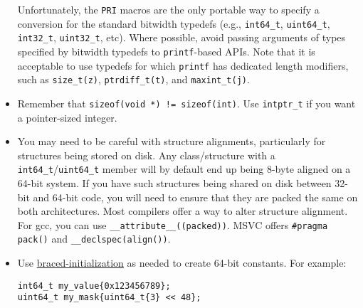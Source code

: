 \begin{itemize}
    Unfortunately, the \texttt{PRI} macros are the only portable way to specify a conversion for the standard bitwidth typedefs (e.g., \texttt{int64_t}, \texttt{uint64_t}, \texttt{int32_t}, \texttt{uint32_t}, etc). Where possible, avoid passing arguments of types specified by bitwidth typedefs to \texttt{printf}-based APIs. Note that it is acceptable to use typedefs for which \texttt{printf} has dedicated length modifiers, such as \texttt{size_t(z)}, \texttt{ptrdiff_t(t)}, and \texttt{maxint_t(j)}.
    \item Remember that \texttt{sizeof(void *) != sizeof(int)}. Use \texttt{intptr_t} if you want a pointer-sized integer.
    \item You may need to be careful with structure alignments, particularly for structures being stored on disk. Any class/structure with a \texttt{int64_t}/\texttt{uint64_t} member will by default end up being 8-byte aligned on a 64-bit system. If you have such structures being shared on disk between 32-bit and 64-bit code, you will need to ensure that they are packed the same on both architectures. Most compilers offer a way to alter structure alignment. For gcc, you can use \texttt{__attribute__((packed))}. MSVC offers \texttt{#pragma pack()} and \texttt{__declspec(align())}.
    \item Use \hyperref[sec:casting]{braced-initialization} as needed to create 64-bit constants. For example:
    \begin{verbatim}
int64_t my_value{0x123456789};
uint64_t my_mask{uint64_t{3} << 48};
    \end{verbatim}
\end{itemize}
